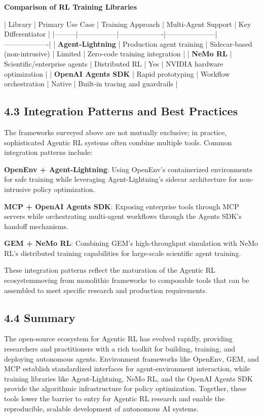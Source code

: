 \textbf{Comparison of RL Training Libraries}

| Library | Primary Use Case | Training Approach | Multi-Agent Support | Key Differentiator |
|---------|-----------------|-------------------|---------------------|-------------------|
| \textbf{Agent-Lightning} | Production agent training | Sidecar-based (non-intrusive) | Limited | Zero-code training integration |
| \textbf{NeMo RL} | Scientific/enterprise agents | Distributed RL | Yes | NVIDIA hardware optimization |
| \textbf{OpenAI Agents SDK} | Rapid prototyping | Workflow orchestration | Native | Built-in tracing and guardrails |

\subsection{4.3 Integration Patterns and Best Practices}

The frameworks surveyed above are not mutually exclusive; in practice, sophisticated Agentic RL systems often combine multiple tools. Common integration patterns include:

\textbf{OpenEnv + Agent-Lightning}: Using OpenEnv's containerized environments for safe training while leveraging Agent-Lightning's sidecar architecture for non-intrusive policy optimization.

\textbf{MCP + OpenAI Agents SDK}: Exposing enterprise tools through MCP servers while orchestrating multi-agent workflows through the Agents SDK's handoff mechanisms.

\textbf{GEM + NeMo RL}: Combining GEM's high-throughput simulation with NeMo RL's distributed training capabilities for large-scale scientific agent training.

These integration patterns reflect the maturation of the Agentic RL ecosystemmoving from monolithic frameworks to composable tools that can be assembled to meet specific research and production requirements.

\subsection{4.4 Summary}

The open-source ecosystem for Agentic RL has evolved rapidly, providing researchers and practitioners with a rich toolkit for building, training, and deploying autonomous agents. Environment frameworks like OpenEnv, GEM, and MCP establish standardized interfaces for agent-environment interaction, while training libraries like Agent-Lightning, NeMo RL, and the OpenAI Agents SDK provide the algorithmic infrastructure for policy optimization. Together, these tools lower the barrier to entry for Agentic RL research and enable the reproducible, scalable development of autonomous AI systems.

